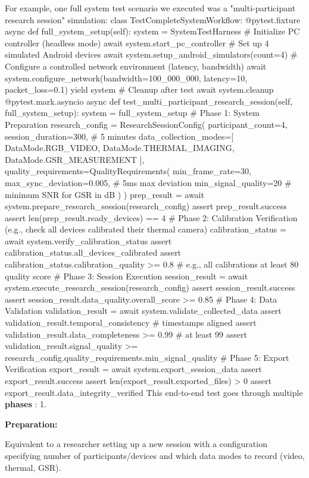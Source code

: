 {{For example, one full system test scenario we executed was a "multi-participant
research session" simulation: class TestCompleteSystemWorkflow: @pytest.fixture async
def full\_system\_setup(self): system = SystemTestHarness # Initialize PC controller
(headless mode) await system.start\_pc\_controller # Set up 4 simulated Android
devices await system.setup\_android\_simulators(count=4) # Configure a controlled
network environment (latency, bandwidth) await
system.configure\_network(bandwidth=100\_000\_000, latency=10, packet\_loss=0.1)
yield system # Cleanup after test await system.cleanup @pytest.mark.asyncio async def
test\_multi\_participant\_research\_session(self, full\_system\_setup): system =
full\_system\_setup # Phase 1: System Preparation research\_config =
ResearchSessionConfig( participant\_count=4, session\_duration=300, # 5 minutes
data\_collection\_modes=[ DataMode.RGB\_VIDEO, DataMode.THERMAL\_IMAGING,
DataMode.GSR\_MEASUREMENT ], quality\_requirements=QualityRequirements(
min\_frame\_rate=30, max\_sync\_deviation=0.005, # 5ms max deviation
min\_signal\_quality=20 # minimum SNR for GSR in dB ) ) prep\_result = await
system.prepare\_research\_session(research\_config) assert prep\_result.success
assert len(prep\_result.ready\_devices) == 4 # Phase 2: Calibration Verification
(e.g., check all devices calibrated their thermal camera) calibration\_status = await
system.verify\_calibration\_status assert
calibration\_status.all\_devices\_calibrated assert
calibration\_status.calibration\_quality >= 0.8 # e.g., all calibrations at least 80%
quality score # Phase 3: Session Execution session\_result = await
system.execute\_research\_session(research\_config) assert session\_result.success
assert session\_result.data\_quality.overall\_score >= 0.85 # Phase 4: Data
Validation validation\_result = await system.validate\_collected\_data assert
validation\_result.temporal\_consistency # timestamps aligned assert
validation\_result.data\_completeness >= 0.99 # at least 99%
assert validation\_result.signal\_quality >=
research\_config.quality\_requirements.min\_signal\_quality # Phase 5: Export
Verification export\_result = await system.export\_session\_data assert
export\_result.success assert len(export\_result.exported\_files) > 0 assert
export\_result.data\_integrity\_verified This end-to-end test goes through multiple
\textbf{phases}
: 1.

\textbf{Preparation:}

Equivalent to a researcher setting up a new session with a configuration specifying
number of participants/devices and which data modes to record (video, thermal, GSR).

}}
